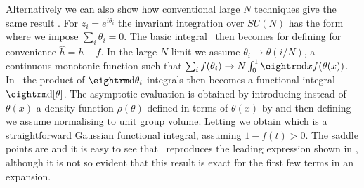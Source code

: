 Alternatively we can also show how conventional large $N$ techniques give the
same result \indexinfN. For $z_i = e^{i\theta_i}$ the invariant integration over
$SU(N)$ has the form
\eqn{}
where we impose $\sum_i \theta_i = 0$. The basic integral \ithree\ then becomes
\eqn{}
for
\eqn{}
defining for convenience ${\hat h}= h-f$.
In the large $N$ limit we assume $\theta_i \to \theta(i/N)$, a continuous monotonic
function such that $ \sum_i f(\theta_i) \to N \int_0^1 \d x f(\theta(x))$. 
In \ifour\ the product of $\d\theta_i$
integrals then becomes a functional integral $\d[\theta]$. The asymptotic
evaluation is obtained by introducing instead of $\theta(x)$ 
a density function $\rho(\theta)$ defined in terms of $\theta(x)$ by
\eqn{}
and then defining
\eqn{}
we assume
\eqn{}
normalising to unit group volume. Letting
\eqn{}
we obtain
\eqn{}
which is a straightforward Gaussian functional integral, assuming $1-f(t)>0$.
The saddle points are
\eqn{}
and it is easy to see that \asymI\
reproduces the leading expression shown in \indexinfN, although it is not so 
evident that this result is exact for the first few terms in an expansion.




